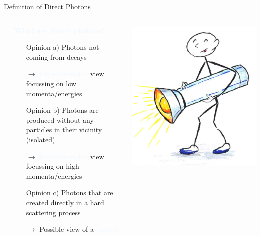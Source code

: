 \documentclass[aspectratio=169,10pt]{beamer}
\begin{document}
  \begin{frame}{Definition of Direct Photons}
    \begin{columns}
     \begin{column}{1.3cm}
     \end{column}
     \begin{column}{9.7cm}        
        \textcolor{AliceBlue}{\textbf{\Large What are direct photons?}}
        \begin{itemize}
        \item [Opinion a)] Photons not coming from decays\\
        \item [$\rightarrow$] \textcolor{AliceBlue}{Experimentalist} view focussing on low momenta/energies
        \item [Opinion b)] Photons are produced without any particles in their vicinity (isolated)\\
        \item [$\rightarrow$] \textcolor{AliceBlue}{Experimentalist} view focussing on high momenta/energies
        \item [Opinion c)] Photons that are created directly in a hard scattering process\\
        \item [$\rightarrow$] Possible view of a \textcolor{AliceBlue}{theorist}
        \end{itemize}      
      \end{column}
      \begin{column}{5cm}
        \includegraphics[width=\textwidth]{general/flashlight.png}

\end{column}
\end{columns}
\end{frame}
\end{document}
